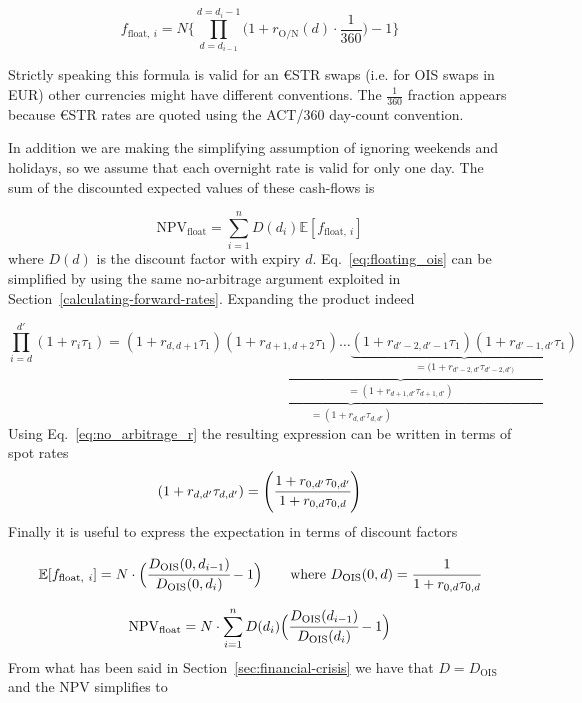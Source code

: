 \begin{equation}
f_{\mathrm{float},~i} = N \Bigg\{\prod_{d=d_{i-1}}^{d=d_i-1}\Big(1+r_{\mathrm{O/N}}(d)\cdot\frac{1}{360}\Big) -1 \Bigg\}
\label{eq:floating_ois}
\end{equation}

Strictly speaking this formula is valid for an \euro STR swaps (i.e. for OIS swaps in EUR) other currencies might have different conventions. The $\frac{1}{360}$ fraction appears because \euro STR rates are quoted using the ACT/360 day-count convention. 

In addition we are making the simplifying assumption of ignoring weekends and holidays, so we assume that each overnight rate is valid for only one day. The sum of the discounted expected values of these cash-flows is

\begin{equation}
\mathrm{NPV}_{\mathrm{float}} = \sum_{i=1}^{n}D(d_i)\mathbb{E}[f_{\mathrm{float},~i}]
\end{equation}
where $D(d)$ is the discount factor with expiry $d$. Eq.~\ref{eq:floating_ois} can be simplified by using the same no-arbitrage argument exploited in Section~\ref{calculating-forward-rates}. Expanding the product indeed

\begin{equation*}
\prod_{i=d}^{d'} (1+r_i\tau_1) = \underbrace{(1+r_{d,d+1}\tau_1)\underbrace{(1+r_{d+1,d+2}\tau_1)\ldots\underbrace{(1+r_{d'-2,d'-1}\tau_1)(1+r_{d'-1,d'}\tau_1)}_{\textstyle =(1+r_{d'-2,d'}\tau_{d'-2,d')}}}_{\textstyle =(1+r_{d+1,d'}\tau_{d+1, d'})}}_{\textstyle =(1+r_{d,d'}\tau_{d,d'})}
\end{equation*}
\noindent
Using Eq.~\ref{eq:no_arbitrage_r} the resulting expression can be written in terms of spot rates
\begin{equation*}
(1+r_{d,d'}\tau_{d,d'}) = \left(\cfrac{1+r_{0, d'}\tau_{0,d'}}{1+r_{0,d}\tau_{0,d}}\right)
\end{equation*}
\noindent Finally it is useful to express the expectation in terms of discount factors

\begin{equation*}
\mathbb{E}[f_{\mathrm{float},~i}] = N\cdot\Big(\cfrac{D_{\mathrm{OIS}}(0, d_{i-1})}{D_{\mathrm{OIS}}(0, d_{i})} - 1\Big)\qquad \mathrm{where}\ D_{\mathrm{OIS}}(0,d)=\cfrac{1}{1+r_{0,d}\tau_{0,d}}
\end{equation*}

\begin{equation*}
\mathrm{NPV}_{\mathrm{float}} = N\cdot \sum_{i=1}^{n}D(d_i) \Big(\cfrac{D_{\mathrm{OIS}}(d_{i-1})}{D_{\mathrm{OIS}}(d_{i})} - 1\Big)
\end{equation*}
From what has been said in Section~\ref{sec:financial-crisis} we have that $D = D_{\mathrm{OIS}}$ and the NPV simplifies to

